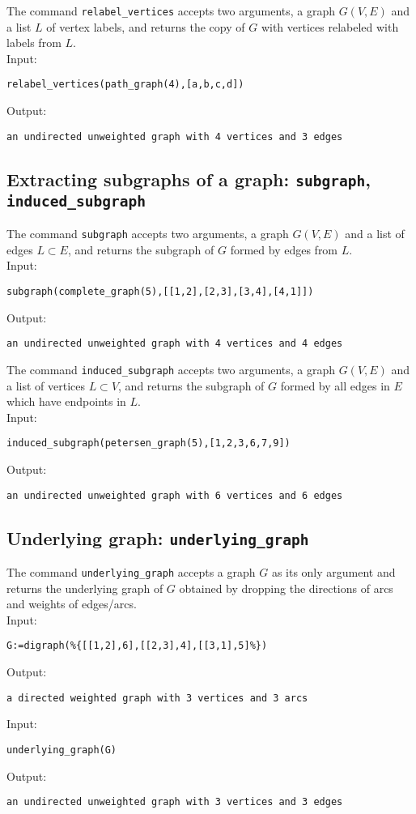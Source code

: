 \documentclass[a4paper,11pt]{article}
\begin{document}
The command {\tt relabel\_vertices} accepts two arguments, a graph $ G(V,E) $ and a list $ L $ of vertex labels, and returns the copy of $ G $ with vertices relabeled with labels from $ L $.\\
Input:
\begin{center}
  \tt relabel\_vertices(path\_graph(4),[a,b,c,d])
\end{center}
Output:
\begin{center}
  \tt an undirected unweighted graph with 4 vertices and 3 edges
\end{center}

\subsection{Extracting subgraphs of a graph: {\tt subgraph}, {\tt induced\_subgraph}}

The command {\tt subgraph} accepts two arguments, a graph $ G(V,E) $ and a list of edges $ L\subset E $, and returns the subgraph of $ G $ formed by edges from $ L $.\\
Input:
\begin{center}
  \tt subgraph(complete\_graph(5),[[1,2],[2,3],[3,4],[4,1]])
\end{center}
Output:
\begin{center}
  \tt an undirected unweighted graph with 4 vertices and 4 edges
\end{center}

The command {\tt induced\_subgraph} accepts two arguments, a graph $ G(V,E) $ and a list of vertices $ L\subset V $, and returns the subgraph of $ G $ formed by all edges in $ E $ which have endpoints in $ L $.\\
Input:
\begin{center}
  \tt induced\_subgraph(petersen\_graph(5),[1,2,3,6,7,9])
\end{center}
Output:
\begin{center}
  \tt an undirected unweighted graph with 6 vertices and 6 edges
\end{center}

\subsection{Underlying graph: {\tt underlying\_graph}}

The command {\tt underlying\_graph} accepts a graph $ G $ as its only argument and returns the underlying graph of $ G $ obtained by dropping the directions of arcs and weights of edges/arcs.\\
Input:
\begin{center}
  \tt G:=digraph(\%\{[[1,2],6],[[2,3],4],[[3,1],5]\%\})
\end{center}
Output:
\begin{center}
  \tt a directed weighted graph with 3 vertices and 3 arcs
\end{center}
Input:
\begin{center}
  \tt underlying\_graph(G)
\end{center}
Output:
\begin{center}
  \tt an undirected unweighted graph with 3 vertices and 3 edges
\end{center}
\end{document}
